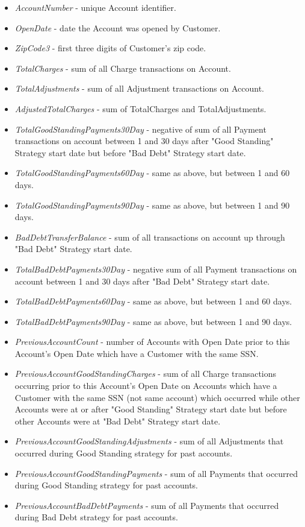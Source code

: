 \documentclass[letterpaper,12pt,titlepage]{article}
\begin{document}
\begin{itemize} 
      \item \textit{AccountNumber} - unique Account identifier.
      \item \textit{OpenDate} - date the Account was opened by Customer.
      \item \textit{ZipCode3} - first three digits of Customer's zip code.
      \item \textit{TotalCharges} - sum of all Charge transactions on Account.
      \item \textit{TotalAdjustments} - sum of all Adjustment transactions on
	    Account.
      \item \textit{AdjustedTotalCharges} - sum of TotalCharges and
	    TotalAdjustments.				
      \item \textit{TotalGoodStandingPayments30Day} - negative of sum of all
	    Payment transactions on account between 1 and 30 days after "Good
	    Standing" Strategy start date but before "Bad Debt" Strategy
	    start date.
      \item \textit{TotalGoodStandingPayments60Day} - same as above, but between
	    1 and 60 days.
      \item \textit{TotalGoodStandingPayments90Day} - same as above, but between
	    1 and 90 days.
      \item \textit{BadDebtTransferBalance} - sum of all transactions on account
	    up through "Bad Debt" Strategy start date.	
      \item \textit{TotalBadDebtPayments30Day} - negative sum of all Payment
	    transactions on account between 1 and 30 days after "Bad Debt"
	    Strategy start date.
      \item \textit{TotalBadDebtPayments60Day} - same as above, but between
	    1 and 60 days.
      \item \textit{TotalBadDebtPayments90Day} - same as above, but between
	    1 and 90 days.
      \item \textit{PreviousAccountCount} - number of Accounts with Open Date
	    prior to this Account's Open Date which have a Customer with the
	    same SSN.
      \item \textit{PreviousAccountGoodStandingCharges} - sum of all Charge
	    transactions occurring prior to this Account's Open Date on Accounts
	    which have a Customer with the same SSN (not same account) which
	    occurred while other Accounts were at or after "Good Standing"
	    Strategy start date but before other Accounts were at "Bad Debt"
	    Strategy start date.
      \item \textit{PreviousAccountGoodStandingAdjustments} - sum of all
	    Adjustments that occurred during Good Standing strategy for past
	    accounts.
      \item \textit{PreviousAccountGoodStandingPayments} - sum of all Payments
	    that occurred during Good Standing strategy for past accounts.
      \item \textit{PreviousAccountBadDebtPayments} - sum of all Payments that
	    occurred during Bad Debt strategy for past accounts.	

\end{itemize}
\end{document}
